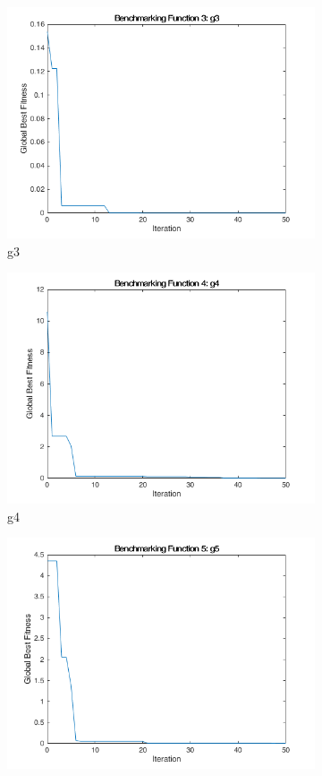 \begin{figure}
\begin{subfigure}[b]{0.4\textwidth}
    \includegraphics[width=\textwidth]{img/summary/g3}
    \caption{g3}
  \end{subfigure}
  \begin{subfigure}[b]{0.4\textwidth}
    \includegraphics[width=\textwidth]{img/summary/g4}
    \caption{g4}
  \end{subfigure}
  \begin{subfigure}[b]{0.4\textwidth}
    \includegraphics[width=\textwidth]{img/summary/g5}

\end{subfigure}
\end{figure}
